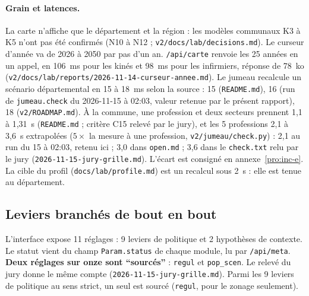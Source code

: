 \paragraph{Grain et latences.}
La carte n'affiche que le département et la région : les modèles communaux K3 à K5 n'ont pas été confirmés (N10 à N12 ; \texttt{v2/\allowbreak{}docs/\allowbreak{}lab/\allowbreak{}decisions.md}).
Le curseur d'année va de 2026 à 2050 par pas d'un an.
\texttt{/\allowbreak{}api/\allowbreak{}carte} renvoie les 25\derive{} années en un appel, en 106\mesure{}~ms pour les kinés et 98\mesure{}~ms pour les infirmiers, réponse de 78\mesure{}~ko (\texttt{v2/\allowbreak{}docs/\allowbreak{}lab/\allowbreak{}reports/\allowbreak{}2026-\allowbreak{}11-\allowbreak{}14-\allowbreak{}curseur-\allowbreak{}annee.md}).
Le jumeau recalcule un scénario départemental en 15 à 18\mesure{}~ms selon la source : 15 (\texttt{README.md}), 16 (run de \texttt{jumeau.check} du 2026-11-15 à 02:03, valeur retenue par le présent rapport), 18 (\texttt{v2/\allowbreak{}ROADMAP.md}).
À la commune, une profession et deux secteurs prennent 1,1 à 1,31\mesure{}~s (\texttt{README.md} ; critère C15 relevé par le jury), et les 5 professions 2,1 à 3,6\derive{}~s extrapolées ($5\times$ la mesure à une profession, \texttt{v2/\allowbreak{}jumeau/\allowbreak{}check.py}) : 2,1 au run du 15 à 02:03, retenu ici ; 3,0 dans \texttt{open.md} ; 3,6 dans le \texttt{check.txt} relu par le jury (\texttt{2026-\allowbreak{}11-\allowbreak{}15-\allowbreak{}jury-\allowbreak{}grille.md}). L'écart est consigné en annexe~\ref{pro:inc-e}.
La cible du profil (\texttt{docs/\allowbreak{}lab/\allowbreak{}profile.md}) est un recalcul sous 2\suppose{}~s : elle est tenue au département.

\subsection{Leviers branchés de bout en bout}\label{pro:leviers}

L'interface expose 11\mesure{} réglages : 9\mesure{} leviers de politique et 2\mesure{} hypothèses de contexte.
Le statut vient du champ \texttt{Param.status} de chaque module, lu par \texttt{/\allowbreak{}api/\allowbreak{}meta}.
\textbf{Deux réglages sur onze sont \enquote{sourcés}}\mesure{} : \texttt{regul} et \texttt{pop\_\allowbreak{}scen}. Le relevé du jury donne le même compte (\texttt{2026-\allowbreak{}11-\allowbreak{}15-\allowbreak{}jury-\allowbreak{}grille.md}).
Parmi les 9\mesure{} leviers de politique au sens strict, un seul est sourcé (\texttt{regul}, pour le zonage seulement)\derive{}.

